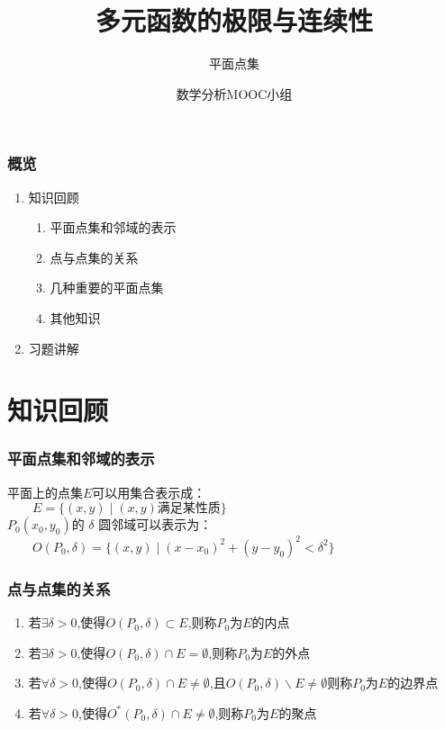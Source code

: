 \documentclass[xetex]{beamer}
\title{多元函数的极限与连续性}
\subtitle{平面点集}
\author{数学分析MOOC小组 }
\date{}
\begin{document}
\frame{\maketitle}

\begin{frame}
    \frametitle{概览}
	
    \begin{enumerate}
        \item 知识回顾
			\begin{enumerate}
           \item 平面点集和邻域的表示
			\item 点与点集的关系
			\item 几种重要的平面点集
			\item 其他知识
        	\end{enumerate}
        \item 习题讲解
        
    \end{enumerate}


\end{frame}

\section{知识回顾}
\begin{frame}
    \frametitle{平面点集和邻域的表示} 
  
平面上的点集$E$可以用集合表示成：\\$\qquad E=\{(x,y)\mid(x,y)\mbox{满足某性质}\}$\\ 
$P_{0}(x_{0},y_{0})$的 $\delta$ 圆邻域可以表示为：\\$\qquad O(P_{0},\delta)= \{ (x,y)\mid(x-x_{0})^2+(y-y_{0})^2<\delta ^2\}$
	
	
\end{frame}

\begin{frame}
    \frametitle{点与点集的关系} 
  
    \begin{enumerate}
\item 若$\exists \delta >0$,使得$O(P_{0},\delta) \subset E$,则称$P_{0}$为$E$的内点
\item 若$\exists \delta >0$,使得$O(P_{0},\delta) \cap E= \emptyset$,则称$P_{0}$为$E$的外点
\item 若$\forall \delta >0$,使得$O(P_{0},\delta) \cap E\ne \emptyset$,且$O(P_{0},\delta) \backslash E \ne \emptyset$则称$P_{0}$为$E$的边界点
\item 若$\forall \delta >0$,使得$O^* (P_{0},\delta) \cap E \ne \emptyset$,则称$P_{0}$为$E$的聚点
	
    \end{enumerate}
\end{frame}
\end{document}
